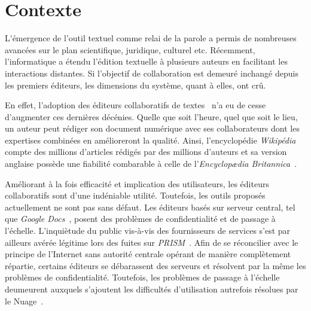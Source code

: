 
\section{Contexte}

\lettrine{L}'émergence de l'outil textuel comme relai de la parole a permis de
nombreuses avancées sur le plan scientifique, juridique, culturel
etc. Récemment, l'informatique a étendu l'édition textuelle à plusieurs auteurs
en facilitant les interactions distantes. Si l'objectif de collaboration est
demeuré inchangé depuis les premiers éditeurs, les dimensions du système, quant
à elles, ont crû.

En effet, l'adoption des éditeurs collaboratifs de
textes~\cite{ellis1991groupware} n'a eu de cesse d'augmenter ces dernières
décénies. Quelle que soit l'heure, quel que soit le lieu, un auteur peut rédiger
son document numérique avec ses collaborateurs dont les expertises combinées en
amélioreront la qualité. Ainsi, l'encyclopédie \emph{Wikipédia} compte des
millions d'articles rédigés par des millions d'auteurs et sa version anglaise
possède une fiabilité combarable à celle de l'\emph{Encyclop\ae{}dia
  Britannica}~\cite{giles2005internet}.

Améliorant à la fois efficacité et implication des utilisateurs, les éditeurs
collaboratifs sont d'une indéniable utilité. Toutefois, les outils proposés
actuellement ne sont pas sans défaut. Les éditeurs basés sur serveur central,
tel que \emph{Google Docs}~\cite{nichols1995high}, posent des problèmes de
confidentialité et de passage à l'échelle. L'inquiètude du public vis-à-vis des
fournisseurs de services s'est par ailleurs avérée légitime lors des fuites sur
\emph{PRISM}~\cite{gellman2013us}. Afin de se réconcilier avec le principe de
l'Internet sans autorité centrale opérant de manière complètement répartie,
certains éditeurs se débarassent des serveurs et résolvent par la même les
problèmes de confidentialité. Toutefois, les problèmes de passage à l'échelle
deumeurent auxquels s'ajoutent les difficultés d'utilisation autrefois résolues
par le Nuage~\cite{mell2011national}.


